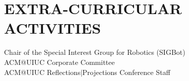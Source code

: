 	\section{EXTRA-CURRICULAR \\ ACTIVITIES}
	Chair of the Special Interest Group for Robotics (SIGBot)\\
	ACM@UIUC Corporate Committee\\
	ACM@UIUC Reflections$|$Projections Conference Staff

